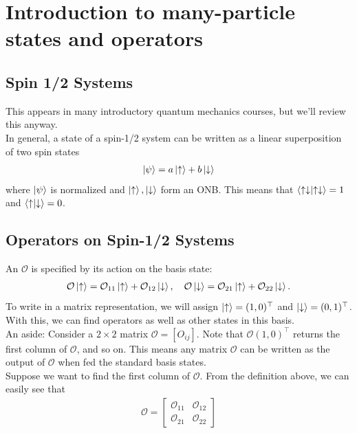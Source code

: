 \documentclass{book}
\theoremstyle{definition}
\begin{document}
\section{Introduction to many-particle states and operators}

\subsection{Spin 1/2 Systems} 

This appears in many introductory quantum mechanics courses, but we'll review this anyway. \\

In general, a state of a spin-1/2 system  can be written as a linear superposition of two spin states
\begin{align}
\ket{\psi} = a\ket{\uparrow} + b\ket{\downarrow}
\end{align}
where $\ket{\psi}$ is normalized and $\ket{\uparrow},\ket{\downarrow}$ form an ONB. This means that $\braket{\uparrow\downarrow} = 1$ and $\braket{\uparrow}{\downarrow} = 0$. 

\subsection{Operators on Spin-1/2 Systems}
An $\mathcal{O}$ is specified by its action on the basis state: 
\begin{align}
\mathcal{O}\ket{\uparrow} = \mathcal{O}_{11}\ket{\uparrow} + \mathcal{O}_{12}\ket{\downarrow},\quad \mathcal{O}\ket{\downarrow} = \mathcal{O}_{21}\ket{\uparrow} + \mathcal{O}_{22}\ket{\downarrow}.
\end{align}
To write in a matrix representation, we will assign $\ket{\uparrow} = (1,0)^\top$ and $\ket{\downarrow} = (0,1)^\top$. With this, we can find operators as well as other states in this basis.\\

An aside: Consider a $2\times 2$ matrix $\mathcal{O} = [O_{ij}]$. Note that $\mathcal{O}(1,0)^\top$ returns the first column of $\mathcal{O}$, and so on. This means any matrix $\mathcal{O}$ can be written as the output of $\mathcal{O}$ when fed the standard basis states. \\

Suppose we want to find the first column of $\mathcal{O}$. From the definition above, we can easily see that
\begin{align}
\mathcal{O} = \begin{bmatrix}
\mathcal{O}_{11} & \mathcal{O}_{12} \\ \mathcal{O}_{21} & \mathcal{O}_{22}
\end{bmatrix}
\end{align}
\end{document}
